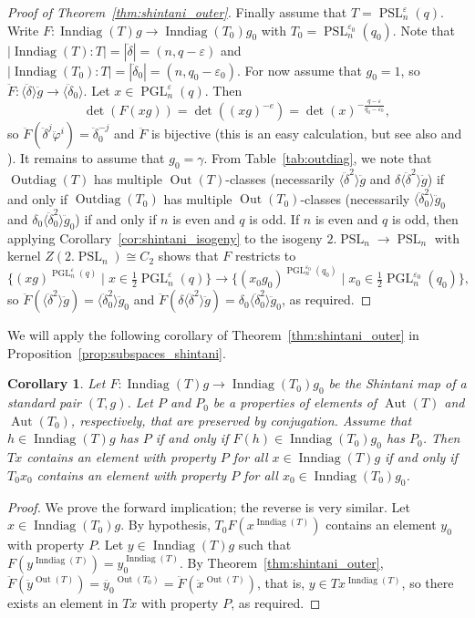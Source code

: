 \documentclass[11pt]{article}
\numberwithin{equation}{section}
\theoremstyle{shdefinition}
\theoremstyle{shplain}
\newtheorem{corollary}[definition]{Corollary}
\newcommand{\g}{\gamma}
\renewcommand{\d}{\delta}
\newcommand{\e}{\varepsilon}
\newcommand{\p}{\varphi}
\newcommand{\<}{\langle}
\renewcommand{\>}{\rangle}
\newcommand{\Aut}{\operatorname{Aut}}
\newcommand{\Out}{\operatorname{Out}}
\newcommand{\Inndiag}{\operatorname{Inndiag}}
\newcommand{\Outdiag}{\operatorname{Outdiag}}
\renewcommand{\:}{\colon}
\newcommand{\PSL}{\operatorname{PSL}}
\newcommand{\PGL}{\operatorname{PGL}}
\begin{document}
\begin{proof}[Proof of Theorem~\ref{thm:shintani_outer}]
Finally assume that $T = \PSL^\e_n(q)$. Write $F\:\Inndiag(T)g \to \Inndiag(T_0)g_0$ with $T_0 = \PSL^{\e_0}_n(q_0)$. Note that $|\Inndiag(T):T|=|\ddot{\d}|=(n,q-\e)$ and $|\Inndiag(T_0):T|=|\ddot{\d}_0|=(n,q_0-\e_0)$. For now assume that $g_0=1$, so $\ddot{F}\: \< \ddot{\d} \>\ddot{g} \to \< \ddot{\d}_0\>$. Let $x \in \PGL^\e_n(q)$. Then
\[
\det(F(xg)) = \det((xg)^{-e}) = \det(x)^{-\frac{q-\e}{q_0-\e_0}},
\]
so $\ddot{F}(\ddot{\d}^j\ddot{\p}^i) = \ddot{\d}_0^{-j}$ and $\ddot{F}$ is bijective (this is an easy calculation, but see also \cite[Lemmas~4.2 and~5.3]{ref:BurnessGuest13} and \cite[Lemma~6.4.2]{ref:Harper}). It remains to assume that $g_0 = \g$. From Table~\ref{tab:outdiag}, we note that $\Outdiag(T)$ has multiple $\Out(T)$-classes (necessarily $\<\ddot{\d}^2\>\ddot{g}$ and $\d\<\ddot{\d}^2\>\ddot{g}$) if and only if $\Outdiag(T_0)$ has multiple $\Out(T_0)$-classes (necessarily $\<\ddot{\d}_0^2\>\ddot{g}_0$ and $\d_0\<\ddot{\d}_0^2\>\ddot{g}_0$) if and only if $n$ is even and $q$ is odd. If $n$ is even and $q$ is odd, then applying Corollary~\ref{cor:shintani_isogeny} to the isogeny $2.\PSL_n \to \PSL_n$ with kernel $Z(2.\PSL_n) \cong C_2$ shows that $F$ restricts to
\[
\{ (xg)^{\PGL^\e_n(q)} \mid x \in \tfrac{1}{2}\PGL^\e_n(q) \} \to \{ (x_0g_0)^{\PGL^{\e_0}_n(q_0)} \mid x_0 \in \tfrac{1}{2}\PGL^{\e_0}_n(q_0) \},
\]
so $\ddot{F}(\<\ddot{\d}^2\>\ddot{g}) = \<\ddot{\d}_0^2\>\ddot{g}_0$ and $\ddot{F}(\d\<\ddot{\d}^2\>\ddot{g}) = \d_0\<\ddot{\d}_0^2\>\ddot{g}_0$, as required.
\end{proof} 

We will apply the following corollary of Theorem~\ref{thm:shintani_outer} in Proposition~\ref{prop:subspaces_shintani}.

\begin{corollary} \label{cor:shintani_outer}
Let $F\:\Inndiag(T)g \to \Inndiag(T_0)g_0$ be the Shintani map of a standard pair $(T,g)$. Let $P$ and $P_0$ be a properties of elements of $\Aut(T)$ and $\Aut(T_0)$, respectively, that are preserved by conjugation. Assume that $h \in \Inndiag(T)g$ has $P$ if and only if $F(h) \in \Inndiag(T_0)g_0$ has $P_0$. Then $Tx$ contains an element with property $P$ for all $x \in \Inndiag(T)g$ if and only if $T_0x_0$ contains an element with property $P$ for all $x_0 \in \Inndiag(T_0)g_0$.
\end{corollary}

\begin{proof}
We prove the forward implication; the reverse is very similar. Let $x \in \Inndiag(T_0)g$. By hypothesis, $T_0F(x^{\Inndiag(T)})$ contains an element $y_0$ with property $P$. Let $y \in \Inndiag(T)g$ such that $F(y^{\Inndiag(T)}) = y_0^{\Inndiag(T)}$. By Theorem~\ref{thm:shintani_outer}, $\ddot{F}(\ddot{y}^{\Out(T)}) = \ddot{y_0}^{\Out(T_0)} = \ddot{F}(\ddot{x}^{\Out(T)})$, that is, $y \in Tx^{\Inndiag(T)}$, so there exists an element in $Tx$ with property $P$, as required.
\end{proof}
\end{document}
